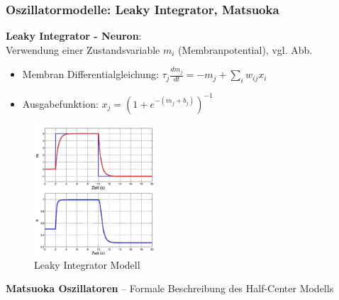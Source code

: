 \subsubsection{Oszillatormodelle: Leaky Integrator, Matsuoka}
\textbf{\glqq Leaky Integrator\grqq{} - Neuron}:\\
Verwendung einer Zustandsvariable $m_i$ (Membranpotential), vgl. Abb.
\begin{itemize}
\item Membran Differentialgleichung: $\tau_j\frac{dm_j}{dt} = - m_j + \sum\limits_i w_{ij}x_i$
\item Ausgabefunktion: $x_j = \left(1+e^{-(m_j + b_j)}\right)^{-1}$
\end{itemize}
\begin{figure}[h!]
	\centering
	\includegraphics[width=0.4\textwidth]{figures/ch05_leakyIntegrator.png}
	\caption{\glqq Leaky Integrator\grqq{} Modell}
	\label{LI}
\end{figure}
\textbf{Matsuoka Oszillatoren} -- Formale Beschreibung des Half-Center Modells
